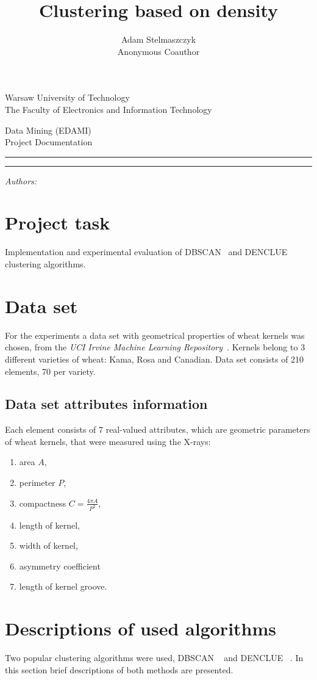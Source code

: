 \documentclass[12pt, a4paper, notitlepage, oneside]{article}
\title{Clustering based on density}
\author{Adam Stelmaszczyk\\ Anonymous Coauthor}
\makeatletter
\newcommand{\linia}{\rule{\linewidth}{0.4mm}}
\renewcommand{\maketitle}{
\begin{titlepage}

    \vspace*{1cm}

    \begin{center}\small

    Warsaw University of Technology\\
    The Faculty of Electronics and Information Technology\\

    \end{center}

    \vspace{3cm}

     \begin{center}

    Data Mining (EDAMI)\\ Project Documentation

    \end{center}

    \noindent\linia

    \begin{center}

      \LARGE \textsc{\@title}

         \end{center}

     \noindent\linia

    \vspace{0.5cm}

    \begin{flushright}

    \begin{minipage}{5cm}

    \textit{\small Authors:}\\

    \normalsize \textsc{\@author} \par

    \end{minipage}

    \vspace{4cm} 
 
     \end{flushright}

    \vspace*{\stretch{6}}

    \begin{center}

    \@date

    \end{center}

  \end{titlepage}
}
\makeatother
\begin{document}
\maketitle
\tableofcontents

\newpage

\section{Project task}
Implementation and experimental evaluation of DBSCAN~\cite{dbscan} and DENCLUE~\cite{denclue} clustering algorithms. 

\section{Data set}

For the experiments a data set with geometrical properties of wheat kernels was chosen,
from the \textit{UCI Irvine Machine Learning Repository}~\cite{dataset}.
Kernels belong to 3 different varieties of wheat: Kama, Rosa and Canadian.
Data set consists of 210 elements, 70 per variety. 

\subsection{Data set attributes information}

Each element consists of 7 real-valued attributes, which are geometric parameters of wheat kernels, 
that were measured using the X-rays: 

\begin{enumerate}
	\item area $A$, 
	\item perimeter $P$, 
	\item compactness $C = \frac{4 \pi A}{P^2}$, 
	\item length of kernel, 
	\item width of kernel, 
	\item asymmetry coefficient 
	\item length of kernel groove. 
\end{enumerate}

\section{Descriptions of used algorithms}
 
Two popular clustering algorithms were used, DBSCAN ~\cite{dbscan} and DENCLUE ~\cite{denclue}. 
In this section brief descriptions of both methods are presented.
\end{document}
